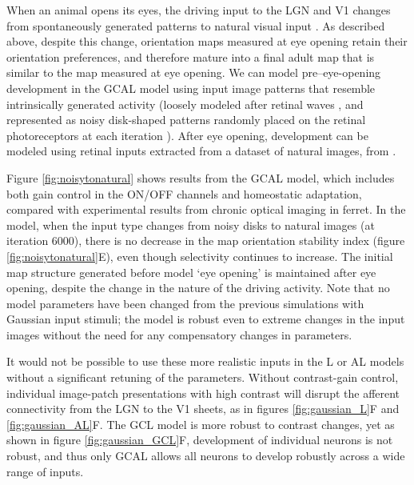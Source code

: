 \documentclass{article}
\begin{document}
When an animal opens its eyes, the driving input to the LGN and V1
changes from spontaneously generated patterns to natural visual input
\citep{Beckmann1982,Tavazoie2000,Cragg1975,Huberman2006,Hooks2006}.
As described above, despite this change, orientation maps measured
at eye opening retain their orientation preferences, and therefore
mature into a final adult map that is similar to the map measured
at eye opening.  We can model pre--eye-opening development in the
GCAL model using input image patterns that resemble intrinsically
generated activity (loosely modeled after retinal waves
\citep{Wong1999}, and represented as noisy disk-shaped patterns
randomly placed on the retinal photoreceptors at each iteration
\citep{bednar:neurocomputing04-or}).  After eye opening, development can be modeled
using retinal inputs extracted from a dataset of natural images, from
\citet{Shouval1996}.

Figure \ref{fig:noisytonatural} shows results from the GCAL model,
which includes both gain control in the ON/OFF channels and
homeostatic adaptation, compared with experimental results from
chronic optical imaging in ferret.  In the model, when the input type
changes from noisy disks to natural images (at iteration 6000), there
is no decrease in the map orientation stability index (figure
\ref{fig:noisytonatural}E), even though selectivity continues to
increase. The initial map structure generated before model `eye
opening' is maintained after eye opening, despite the change in the
nature of the driving activity.  Note that no model parameters have
been changed from the previous simulations with Gaussian input
stimuli; the model is robust even to extreme changes in the input
images without the need for any compensatory changes in parameters.

It would not be possible to use these more realistic
inputs in the L or AL models without a significant retuning of the
parameters. Without contrast-gain control, individual image-patch
presentations with high contrast will disrupt the afferent
connectivity from the LGN to the V1 sheets, as in figures
\ref{fig:gaussian_L}F and \ref{fig:gaussian_AL}F.  The
GCL model is more robust to contrast changes, yet as shown in figure
\ref{fig:gaussian_GCL}F, development of individual neurons is not
robust, and thus only GCAL allows all neurons to develop robustly
across a wide range of inputs.
\end{document}
